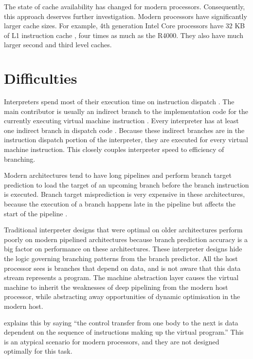		The state of cache availability has changed for modern processors. Consequently, this approach deserves further investigation. Modern processors have significantly larger cache sizes. For example, 4th generation Intel Core processors have 32 KB of L1 instruction cache \citep{optimisationreference}, four times as much as the R4000. They also have much larger second and third level caches.
		
	
		
	\section{Difficulties}
		Interpreters spend most of their execution time on instruction dispatch \citep{modernarchvm}. The main contributor is usually an indirect branch to the implementation code for the currently executing virtual machine instruction \citep{optimizingindirectbranch}. Every interpreter has at least one indirect branch in dispatch code \citep{modernarchvm}. Because these indirect branches are in the instruction dispatch portion of the interpreter, they are executed for every virtual machine instruction. This closely couples interpreter speed to efficiency of branching.
		
		Modern architectures tend to have long pipelines and perform branch target prediction to load the target of an upcoming branch before the branch instruction is executed. Branch target misprediction is very expensive in these architectures, because the execution of a branch happens late in the pipeline but affects the start of the pipeline \citep{optimizingindirectbranch}.
				
		Traditional interpreter designs that were optimal on older architectures perform poorly on modern pipelined architectures because branch prediction accuracy is a big factor on performance on these architectures. These interpreter designs hide the logic governing branching patterns from the branch predictor. All the host processor sees is branches that depend on data, and is not aware that this data stream represents a program. The machine abstraction layer causes the virtual machine to inherit the weaknesses of deep pipelining from the modern host processor, while abstracting away opportunities of dynamic optimisation in the modern host.
		
		\cite{yeti} explains this by saying ``the control transfer from one body to the next is data dependent on the sequence of instructions making up the virtual program.'' This is an atypical scenario for modern processors, and they are not designed optimally for this task.
		
